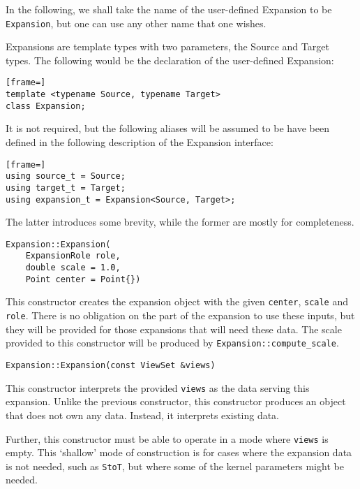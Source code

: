 In the following, we shall take the name of the user-defined Expansion to
be \texttt{Expansion}, but one can use any other name that one wishes.

Expansions are template types with two parameters, the Source and Target
types. The following would be the declaration of the user-defined Expansion:

\begin{lstlisting}[frame=]
template <typename Source, typename Target>
class Expansion;
\end{lstlisting}

\noindent It is not required, but the following aliases will be assumed to be
have been defined in the following description of the Expansion interface:

\begin{lstlisting}[frame=]
using source_t = Source;
using target_t = Target;
using expansion_t = Expansion<Source, Target>;
\end{lstlisting}

\noindent The latter introduces some brevity, while the former are mostly
for completeness.

\begin{lstlisting}
Expansion::Expansion(
    ExpansionRole role,
    double scale = 1.0,
    Point center = Point{})
\end{lstlisting}

\noindent This constructor creates the expansion object with the given
\texttt{center}, \texttt{scale} and \texttt{role}. There is no obligation on
the part of the expansion to use these inputs, but they will be provided for
those expansions that will need these data.
The scale provided to this constructor will be produced by
\texttt{Expansion::compute\_scale}.

\begin{lstlisting}
Expansion::Expansion(const ViewSet &views)
\end{lstlisting}

\noindent This constructor interprets the provided \texttt{views} as the data
serving this expansion. Unlike the previous constructor, this constructor
produces an object that does not own any data. Instead, it interprets existing
data.

Further, this constructor must be able to operate in a mode where \texttt{views}
is empty. This `shallow' mode of construction is for cases where the
expansion data is not needed, such as \texttt{StoT}, but where
some of the kernel parameters might be needed.


